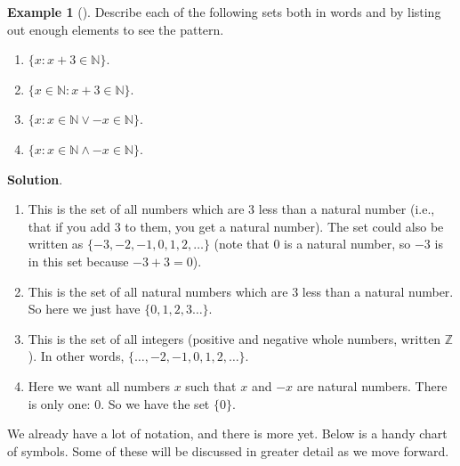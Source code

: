 \documentclass[10pt,]{book}
\theoremstyle{plain}
\theoremstyle{definition}
\theoremstyle{definition}
\newtheorem{example}[theorem]{Example}
\theoremstyle{definition}
\theoremstyle{definition}
\numberwithin{equation}{chapter}
\def\N{\mathbb N}
\def\Z{\mathbb Z}
\def\st{:}
\begin{document}
\begin{example}[]\label{example-39}
\hypertarget{p-1446}{}%
Describe each of the following sets both in words and by listing out enough elements to see the pattern.%
\par
\hypertarget{p-1447}{}%
\leavevmode%
\begin{enumerate}
\item\hypertarget{li-405}{}\(\{x \st x + 3 \in \N\}\).%
\item\hypertarget{li-406}{}\(\{x \in \N \st x + 3 \in \N\}\).%
\item\hypertarget{li-407}{}\(\{x \st x \in \N \vee -x \in \N\}\).%
\item\hypertarget{li-408}{}\(\{x \st x \in \N \wedge -x \in \N\}\).%
\end{enumerate}
%
\par\smallskip%
\noindent\textbf{Solution}.\hypertarget{solution-128}{}\quad%
\hypertarget{p-1448}{}%
\leavevmode%
\begin{enumerate}
\item\hypertarget{li-409}{}\hypertarget{p-1449}{}%
This is the set of all numbers which are 3 less than a natural number (i.e., that if you add 3 to them, you get a natural number). The set could also be written as \(\{-3, -2, -1, 0, 1, 2, \ldots\}\) (note that 0 is a natural number, so \(-3\) is in this set because \(-3 + 3 = 0\)).%
\item\hypertarget{li-410}{}\hypertarget{p-1450}{}%
This is the set of all natural numbers which are 3 less than a natural number. So here we just have \(\{0, 1, 2,3 \ldots\}\).%
\item\hypertarget{li-411}{}\hypertarget{p-1451}{}%
This is the set of all integers  (positive and negative whole numbers, written \(\Z\)). In other words, \(\{\ldots, -2, -1, 0, 1, 2, \ldots\}\).%
\item\hypertarget{li-412}{}\hypertarget{p-1452}{}%
Here we want all numbers \(x\) such that \(x\) and \(-x\) are natural numbers. There is only one: 0. So we have the set \(\{0\}\).%
\end{enumerate}
%
\end{example}
\hypertarget{p-1453}{}%
We already have a lot of notation, and there is more yet. Below is a handy chart of symbols. Some of these will be discussed in greater detail as we move forward.%
\end{document}
